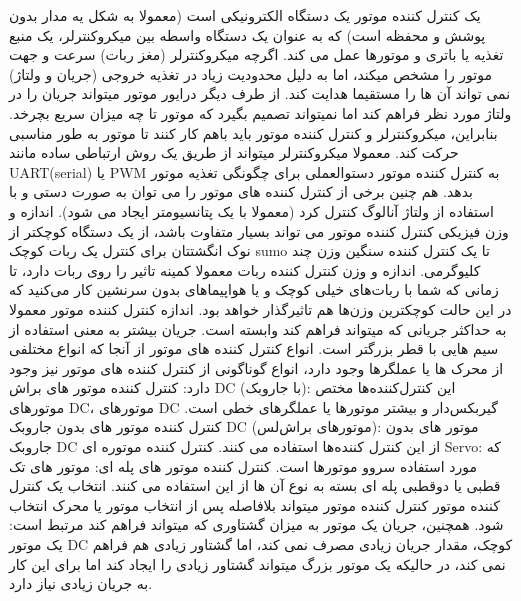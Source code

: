 
یک کنترل کننده موتور یک دستگاه الکترونیکی است (معمولا به شکل یه مدار بدون پوشش و محفظه است) که به عنوان یک دستگاه واسطه بین میکروکنترلر، یک منبع تغذیه یا باتری و موتورها عمل می کند.
اگرچه میکروکنترلر (مغز ربات) سرعت و جهت موتور را مشخص میکند، اما به دلیل محدودیت زیاد در تغذیه خروجی (جریان و ولتاژ) نمی تواند آن ها را مستقیما هدایت کند. از طرف دیگر درایور موتور میتواند جریان را در ولتاژ مورد نظر فراهم کند اما نمیتواند تصمیم بگیرد که موتور تا چه میزان سریع بچرخد.
بنابراین، میکروکنترلر و کنترل کننده موتور باید باهم کار کنند تا موتور به طور مناسبی حرکت کند. معمولا میکروکنترلر میتواند از طریق یک روش ارتباطی ساده مانند UART(serial) یا PWM به کنترل کننده موتور دستوالعملی برای چگونگی تغذیه موتور بدهد. هم چنین برخی از کنترل کننده های موتور را می توان به صورت دستی و با استفاده از ولتاژ آنالوگ کنترل کرد (معمولا با یک پتانسیومتر ایجاد می شود).
اندازه و وزن فیزیکی کنترل کننده موتور می تواند بسیار متفاوت باشد، از یک دستگاه کوچکتر از نوک انگشتتان برای کنترل یک ربات کوچک sumo تا یک کنترل کننده سنگین وزن چند کلیوگرمی. اندازه و وزن کنترل کننده ربات معمولا کمینه تاثیر را روی ربات دارد، تا زمانی که شما با ربات‌های خیلی کوچک و یا هواپیماهای بدون سرنشین کار می‌کنید که در این حالت کوچکترین وزن‌ها هم تاثیرگذار خواهد بود. اندازه کنترل کننده موتور معمولا به حداکثر جریانی که میتواند فراهم کند وابسته است. جریان بیشتر به معنی استفاده از سیم هایی با قطر بزرگتر است.
انواع کنترل کننده های موتور
از آنجا که انواع مختلفی از محرک ها یا عملگرها وجود دارد، انواع گوناگونی از کنترل کننده های موتور نیز وجود دارد:
کنترل کننده موتور های براش DC (با جاروبک): این کنترل‌کننده‌ها مختص موتورهای DC، موتورهای DC گیربکس‌دار و بیشتر موتورها یا عملگرهای خطی است.
کنترل کننده موتور های بدون جاروبک DC (موتورهای براش‌لس): موتور های بدون جاروبک DC از این کنترل کننده‌ها استفاده می کنند.
کنترل کننده موتوره ای Servo: که مورد استفاده سروو موتورها است.
کنترل کننده موتور های پله ای: موتور های تک قطبی یا دوقطبی پله ای بسته به نوع آن ها از این استفاده می کنند.
انتخاب یک کنترل کننده موتور
کنترل کننده موتور میتواند بلافاصله پس از انتخاب موتور یا محرک انتخاب شود. همچنین، جریان یک موتور به میزان گشتاوری که میتواند فراهم کند مرتبط است: یک موتور DC کوچک، مقدار جریان زیادی مصرف نمی کند، اما گشتاور زیادی هم فراهم نمی کند، در حالیکه یک موتور بزرگ میتواند گشتاور زیادی را ایجاد کند اما برای این کار به جریان زیادی نیاز دارد.


